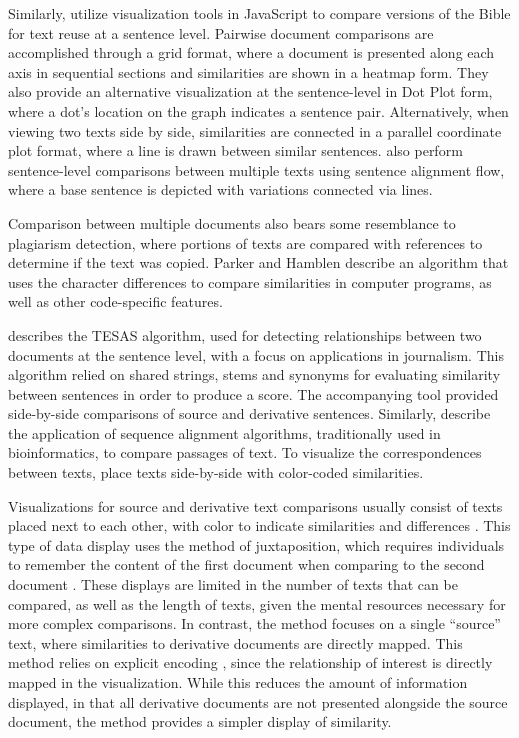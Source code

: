 Similarly, \citet{janicke_visualizations_2014} utilize visualization tools in JavaScript to compare versions of the Bible for text reuse at a sentence level.
Pairwise document comparisons are accomplished through a grid format, where a document is presented along each axis in sequential sections and similarities are shown in a heatmap form.
They also provide an alternative visualization at the sentence-level in Dot Plot form, where a dot's location on the graph indicates a sentence pair.
Alternatively, when viewing two texts side by side, similarities are connected in a parallel coordinate plot format, where a line is drawn between similar sentences.
\citet{janicke_visualizations_2014} also perform sentence-level comparisons between multiple texts using sentence alignment flow, where a base sentence is depicted with variations connected via lines.

Comparison between multiple documents also bears some resemblance to plagiarism detection, where portions of texts are compared with references to determine if the text was copied.
Parker and Hamblen \citep{parker} describe an algorithm that uses the character differences to compare similarities in computer programs, as well as other code-specific features.

\citet{piao_tool_2003} describes the TESAS algorithm, used for detecting relationships between two documents at the sentence level, with a focus on applications in journalism.
This algorithm relied on shared strings, stems and synonyms for evaluating similarity between sentences in order to produce a score.
The accompanying tool provided side-by-side comparisons of source and derivative sentences.
Similarly, \citet{olsen_something_2011} describe the application of sequence alignment algorithms, traditionally used in bioinformatics, to compare passages of text.
To visualize the correspondences between texts, \citet{olsen_something_2011} place texts side-by-side with color-coded similarities.

Visualizations for source and derivative text comparisons usually consist of texts placed next to each other, with color to indicate similarities and differences \citep{olsen_something_2011, fryTracingOrigin2018, piao_tool_2003}.
This type of data display uses the method of juxtaposition, which requires individuals to remember the content of the first document when comparing to the second document \citep{gleicher_visual_2011}.
These displays are limited in the number of texts that can be compared, as well as the length of texts, given the mental resources necessary for more complex comparisons.
In contrast, the  method focuses on a single ``source'' text, where similarities to derivative documents are directly mapped.
This method relies on explicit encoding \citep{gleicher_visual_2011}, since the relationship of interest is directly mapped in the visualization.
While this reduces the amount of information displayed, in that all derivative documents are not presented alongside the source document, the method provides a simpler display of similarity.

